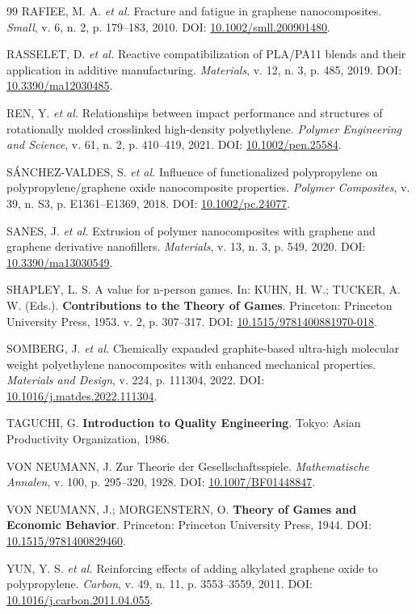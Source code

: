\documentclass[12pt,a4paper,twoside]{article}
\begin{document}
\begin{thebibliography}{99}
RAFIEE, M. A. \textit{et al.} Fracture and fatigue in graphene nanocomposites. \textit{Small}, v. 6, n. 2, p. 179--183, 2010. DOI: \href{https://doi.org/10.1002/smll.200901480}{10.1002/smll.200901480}.

RASSELET, D. \textit{et al.} Reactive compatibilization of PLA/PA11 blends and their application in additive manufacturing. \textit{Materials}, v. 12, n. 3, p. 485, 2019. DOI: \href{https://doi.org/10.3390/ma12030485}{10.3390/ma12030485}.

REN, Y. \textit{et al.} Relationships between impact performance and structures of rotationally molded crosslinked high-density polyethylene. \textit{Polymer Engineering and Science}, v. 61, n. 2, p. 410--419, 2021. DOI: \href{https://doi.org/10.1002/pen.25584}{10.1002/pen.25584}.

SÁNCHEZ-VALDES, S. \textit{et al.} Influence of functionalized polypropylene on polypropylene/graphene oxide nanocomposite properties. \textit{Polymer Composites}, v. 39, n. S3, p. E1361--E1369, 2018. DOI: \href{https://doi.org/10.1002/pc.24077}{10.1002/pc.24077}.

SANES, J. \textit{et al.} Extrusion of polymer nanocomposites with graphene and graphene derivative nanofillers. \textit{Materials}, v. 13, n. 3, p. 549, 2020. DOI: \href{https://doi.org/10.3390/ma13030549}{10.3390/ma13030549}.

SHAPLEY, L. S. A value for n-person games. In: KUHN, H. W.; TUCKER, A. W. (Eds.). \textbf{Contributions to the Theory of Games}. Princeton: Princeton University Press, 1953. v. 2, p. 307--317. DOI: \href{https://doi.org/10.1515/9781400881970-018}{10.1515/9781400881970-018}.

SOMBERG, J. \textit{et al.} Chemically expanded graphite-based ultra-high molecular weight polyethylene nanocomposites with enhanced mechanical properties. \textit{Materials and Design}, v. 224, p. 111304, 2022. DOI: \href{https://doi.org/10.1016/j.matdes.2022.111304}{10.1016/j.matdes.2022.111304}.

TAGUCHI, G. \textbf{Introduction to Quality Engineering}. Tokyo: Asian Productivity Organization, 1986.

VON NEUMANN, J. Zur Theorie der Gesellschaftsspiele. \textit{Mathematische Annalen}, v. 100, p. 295--320, 1928. DOI: \href{https://doi.org/10.1007/BF01448847}{10.1007/BF01448847}.

VON NEUMANN, J.; MORGENSTERN, O. \textbf{Theory of Games and Economic Behavior}. Princeton: Princeton University Press, 1944. DOI: \href{https://doi.org/10.1515/9781400829460}{10.1515/9781400829460}.

YUN, Y. S. \textit{et al.} Reinforcing effects of adding alkylated graphene oxide to polypropylene. \textit{Carbon}, v. 49, n. 11, p. 3553--3559, 2011. DOI: \href{https://doi.org/10.1016/j.carbon.2011.04.055}{10.1016/j.carbon.2011.04.055}.

\end{thebibliography}
\end{document}
